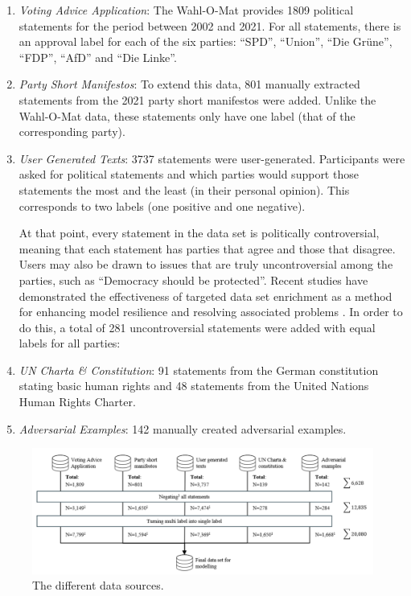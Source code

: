\begin{enumerate}
    \item \textit{Voting Advice Application}: The Wahl-O-Mat \citep{wahlomat} provides 1809 political statements for the period between 2002 and 2021. For all statements, there is an approval label for each of the six parties: ``SPD'', ``Union'', ``Die Grüne'', ``FDP'', ``AfD'' and ``Die Linke''.
    \item \textit{Party Short Manifestos}: To extend this data, 801 manually extracted statements from the 2021 party short manifestos were added. Unlike the Wahl-O-Mat data, these statements only have one label (that of the corresponding party).
    \item \textit{User Generated Texts}: 3737 statements were user-generated. Participants were asked for political statements and which parties would support those statements the most and the least (in their personal opinion). This corresponds to two labels (one positive and one negative).

At that point, every statement in the data set is politically controversial, meaning that each statement has parties that agree and those that disagree. Users may also be drawn to issues that are truly uncontroversial among the parties, such as ``Democracy should be protected''. Recent studies have demonstrated the effectiveness of targeted data set enrichment as a method for enhancing model resilience and resolving associated problems \citep{gupta2021synthesizing, bakhtin2022human}. In order to do this, a total of 281 uncontroversial statements were added with equal labels for all parties:

    \item \textit{UN Charta \& Constitution}: 91 statements from the German constitution stating basic human rights and 48 statements from the United Nations Human Rights Charter.
    \item \textit{Adversarial Examples}: 142 manually created adversarial examples.
\end{enumerate}

\begin{figure}[h]
\centering
\includegraphics[width = 1\linewidth]{figures/Data.png}
\caption{The different data sources.}
\label{fig:data}
\end{figure}

